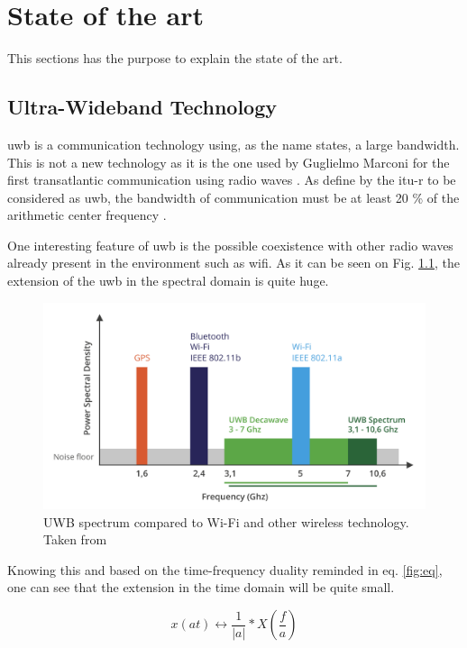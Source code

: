 % 			 
%
%

\chapter{State of the art}
\label{stateoftheart}

This sections has the purpose to explain the state of the art.

\section{Ultra-Wideband Technology}
\label{uwb}
\gls{uwb} is a communication technology using, as the name states, a large bandwidth. This is not a new technology as it is the one used by  Guglielmo Marconi for the first transatlantic communication using radio waves \cite{nekoogar2005uwb}. As define by the \gls{itu-r} to be considered as \gls{uwb}, the bandwidth of communication must be at least 20 \% of the arithmetic center frequency \cite{itur2006characteristics}.
\vspace{2mm}

One interesting feature of \gls{uwb} is the possible coexistence with other radio waves already present in the environment such as \gls{wifi}. As it can be seen on Fig. \ref{fig:UWB_Techonology}, the extension of the \gls{uwb} in the spectral domain is quite huge. 

\begin{figure}[H]
\includegraphics[width=.6\linewidth]{Images/uwb_bandwidth.png}
\centering
\caption{UWB spectrum compared to Wi-Fi and other wireless technology. Taken from \cite{itur2006characteristics}}
\label{fig:UWB_Techonology}
\end{figure} 

Knowing this and based on the time-frequency duality reminded in eq. \ref{fig:eq}, one can see that the extension in the time domain will be quite small.

\begin{equation}
	x(at) \longleftrightarrow \frac{1}{|a|}*X(\frac{f}{a})
\label{fig:eq}
\end{equation}

